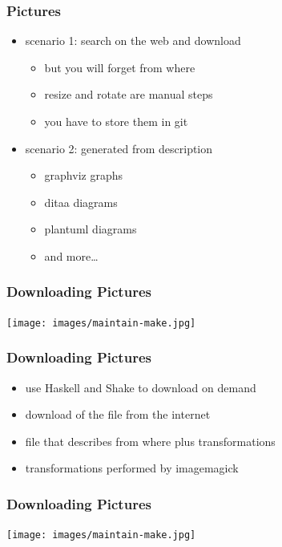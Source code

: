 \documentclass{beamer}
\begin{document}
\begin{frame}
  \frametitle{Pictures}
  \begin{itemize}
  \item scenario 1: search on the web and download
    \begin{itemize}
    \item but you will forget from where
    \item resize and rotate are manual steps
    \item you have to store them in git
    \end{itemize}
  \item scenario 2: generated from description
    \begin{itemize}
    \item graphviz graphs
    \item ditaa diagrams
    \item plantuml diagrams
    \item and more\ldots{}
    \end{itemize}
  \end{itemize}
\end{frame}

\begin{frame}
  \frametitle{Downloading Pictures}
  \begin{center}
    \texttt{[image: images/maintain-make.jpg]}
  \end{center}
\end{frame}

\begin{frame}
  \frametitle{Downloading Pictures}
  \begin{itemize}
  \item use Haskell and Shake to download on demand
  \item download of the file from the internet
  \item file that describes from where plus transformations
  \item transformations performed by imagemagick
  \end{itemize}
\end{frame}

\begin{frame}
  \frametitle{Downloading Pictures}
  \begin{center}
    \texttt{[image: images/maintain-make.jpg]}
    \inputminted{text}{images/maintain-make.src}
  \end{center}
\end{frame}
\end{document}
